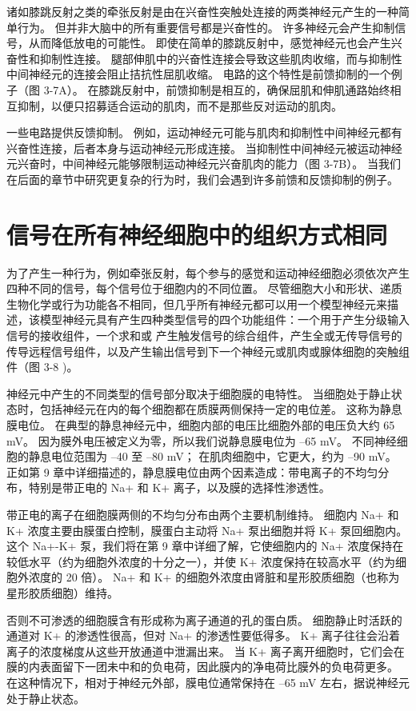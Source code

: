 诸如膝跳反射之类的牵张反射是由在兴奋性突触处连接的两类神经元产生的一种简单行为。 但并非大脑中的所有重要信号都是兴奋性的。 许多神经元会产生抑制信号，从而降低放电的可能性。 即使在简单的膝跳反射中，感觉神经元也会产生兴奋性和抑制性连接。 腿部伸肌中的兴奋性连接会导致这些肌肉收缩，而与抑制性中间神经元的连接会阻止拮抗性屈肌收缩。 电路的这个特性是前馈抑制的一个例子（图 3-7A）。 在膝跳反射中，前馈抑制是相互的，确保屈肌和伸肌通路始终相互抑制，以便只招募适合运动的肌肉，而不是那些反对运动的肌肉。

一些电路提供反馈抑制。 例如，运动神经元可能与肌肉和抑制性中间神经元都有兴奋性连接，后者本身与运动神经元形成连接。 当抑制性中间神经元被运动神经元兴奋时，中间神经元能够限制运动神经元兴奋肌肉的能力（图 3-7B）。 当我们在后面的章节中研究更复杂的行为时，我们会遇到许多前馈和反馈抑制的例子。

\section{信号在所有神经细胞中的组织方式相同}
为了产生一种行为，例如牵张反射，每个参与的感觉和运动神经细胞必须依次产生四种不同的信号，每个信号位于细胞内的不同位置。 尽管细胞大小和形状、递质生物化学或行为功能各不相同，但几乎所有神经元都可以用一个模型神经元来描述，该模型神经元具有产生四种类型信号的四个功能组件：一个用于产生分级输入信号的接收组件，一个求和或 产生触发信号的综合组件，产生全或无传导信号的传导远程信号组件，以及产生输出信号到下一个神经元或肌肉或腺体细胞的突触组件（图 3-8 )。

神经元中产生的不同类型的信号部分取决于细胞膜的电特性。 当细胞处于静止状态时，包括神经元在内的每个细胞都在质膜两侧保持一定的电位差。 这称为静息膜电位。 在典型的静息神经元中，细胞内部的电压比细胞外部的电压负大约 65 mV。 因为膜外电压被定义为零，所以我们说静息膜电位为 –65 mV。 不同神经细胞的静息电位范围为 –40 至 –80 mV； 在肌肉细胞中，它更大，约为 –90 mV。 正如第 9 章中详细描述的，静息膜电位由两个因素造成：带电离子的不均匀分布，特别是带正电的 Na+ 和 K+ 离子，以及膜的选择性渗透性。

带正电的离子在细胞膜两侧的不均匀分布由两个主要机制维持。 细胞内 Na+ 和 K+ 浓度主要由膜蛋白控制，膜蛋白主动将 Na+ 泵出细胞并将 K+ 泵回细胞内。 这个 Na+-K+ 泵，我们将在第 9 章中详细了解，它使细胞内的 Na+ 浓度保持在较低水平（约为细胞外浓度的十分之一），并使 K+ 浓度保持在较高水平（约为细胞外浓度的 20 倍）。 Na+ 和 K+ 的细胞外浓度由肾脏和星形胶质细胞（也称为星形胶质细胞）维持。

否则不可渗透的细胞膜含有形成称为离子通道的孔的蛋白质。 细胞静止时活跃的通道对 K+ 的渗透性很高，但对 Na+ 的渗透性要低得多。 K+ 离子往往会沿着离子的浓度梯度从这些开放通道中泄漏出来。 当 K+ 离子离开细胞时，它们会在膜的内表面留下一团未中和的负电荷，因此膜内的净电荷比膜外的负电荷更多。 在这种情况下，相对于神经元外部，膜电位通常保持在 –65 mV 左右，据说神经元处于静止状态。

